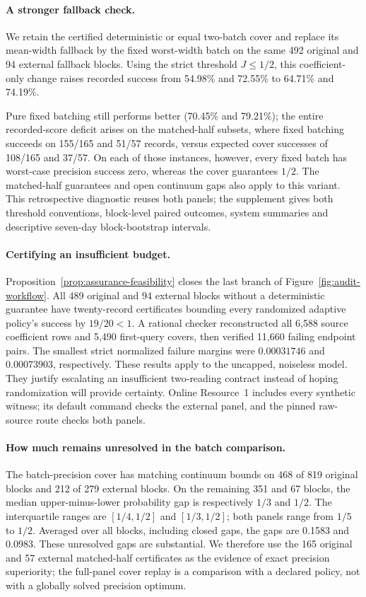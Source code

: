 \documentclass[12pt]{article}
\begin{document}
\paragraph{A stronger fallback check.}
We retain the certified deterministic or equal two-batch cover and replace its mean-width fallback by the fixed worst-width batch on the same 492 original and 94 external fallback blocks. Using the strict threshold $J\leq1/2$, this coefficient-only change raises recorded success from 54.98\% and 72.55\% to 64.71\% and 74.19\%.

Pure fixed batching still performs better (70.45\% and 79.21\%); the entire recorded-score deficit arises on the matched-half subsets, where fixed batching succeeds on 155/165 and 51/57 records, versus expected cover successes of 108/165 and 37/57. On each of those instances, however, every fixed batch has worst-case precision success zero, whereas the cover guarantees $1/2$. The matched-half guarantees and open continuum gaps also apply to this variant. This retrospective diagnostic reuses both panels; the supplement gives both threshold conventions, block-level paired outcomes, system summaries and descriptive seven-day block-bootstrap intervals.
\paragraph{Certifying an insufficient budget.}
Proposition~\ref{prop:assurance-feasibility} closes the last branch of
Figure~\ref{fig:audit-workflow}. All 489 original and 94 external blocks
without a deterministic guarantee have twenty-record certificates bounding
every randomized adaptive policy's success by $19/20<1$. A rational checker
reconstructed all 6,588 source coefficient rows and 5,490 first-query covers,
then verified 11,660 failing endpoint pairs. The smallest strict normalized
failure margins were $0.00031746$ and $0.00073903$, respectively.
These results apply to the uncapped, noiseless model. They justify escalating
an insufficient two-reading contract instead of hoping randomization will
provide certainty. Online Resource~1 includes every synthetic witness; its
default command checks the external panel, and the pinned raw-source route
checks both panels.
\paragraph{How much remains unresolved in the batch comparison.}
The batch-precision cover has matching continuum bounds on 468 of 819 original
blocks and 212 of 279 external blocks. On the remaining 351 and 67 blocks,
the median upper-minus-lower probability gap is respectively $1/3$ and $1/2$.
The interquartile ranges are $[1/4,1/2]$ and $[1/3,1/2]$; both panels range
from $1/5$ to $1/2$. Averaged over all blocks, including closed gaps, the gaps
are 0.1583 and 0.0983. These unresolved gaps are substantial. We therefore
use the 165 original and 57 external matched-half certificates as the evidence
of exact precision superiority; the full-panel cover replay is a comparison
with a declared policy, not with a globally solved precision optimum.
\end{document}
